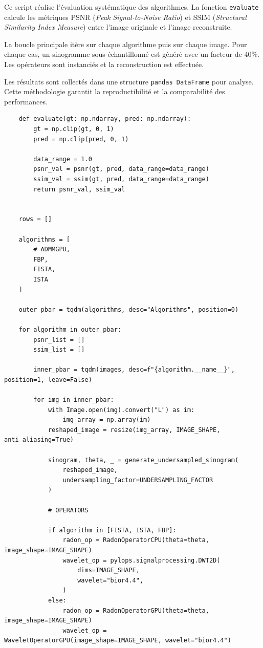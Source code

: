 
Ce script réalise l'évaluation systématique des algorithmes. La fonction \texttt{evaluate} calcule les métriques PSNR (\emph{Peak Signal-to-Noise Ratio}) et SSIM (\emph{Structural Similarity Index Measure}) entre l'image originale et l'image reconstruite.

La boucle principale itère sur chaque algorithme puis sur chaque image. Pour chaque cas, un sinogramme sous-échantillonné est généré avec un facteur de $40\%$. Les opérateurs sont instanciés et la reconstruction est effectuée.

Les résultats sont collectés dans une structure \texttt{pandas DataFrame} pour analyse. Cette méthodologie garantit la reproductibilité et la comparabilité des performances.
\begin{verbatim}
    def evaluate(gt: np.ndarray, pred: np.ndarray):
        gt = np.clip(gt, 0, 1)
        pred = np.clip(pred, 0, 1)

        data_range = 1.0
        psnr_val = psnr(gt, pred, data_range=data_range)
        ssim_val = ssim(gt, pred, data_range=data_range)
        return psnr_val, ssim_val


    rows = []

    algorithms = [
        # ADMMGPU,
        FBP,
        FISTA,
        ISTA
    ]

    outer_pbar = tqdm(algorithms, desc="Algorithms", position=0)

    for algorithm in outer_pbar:
        psnr_list = []
        ssim_list = []

        inner_pbar = tqdm(images, desc=f"{algorithm.__name__}", position=1, leave=False)

        for img in inner_pbar:
            with Image.open(img).convert("L") as im:
                img_array = np.array(im)
            reshaped_image = resize(img_array, IMAGE_SHAPE, anti_aliasing=True)

            sinogram, theta, _ = generate_undersampled_sinogram(
                reshaped_image,
                undersampling_factor=UNDERSAMPLING_FACTOR
            )

            # OPERATORS

            if algorithm in [FISTA, ISTA, FBP]:
                radon_op = RadonOperatorCPU(theta=theta, image_shape=IMAGE_SHAPE)
                wavelet_op = pylops.signalprocessing.DWT2D(
                    dims=IMAGE_SHAPE,
                    wavelet="bior4.4",
                )
            else:
                radon_op = RadonOperatorGPU(theta=theta, image_shape=IMAGE_SHAPE)
                wavelet_op = WaveletOperatorGPU(image_shape=IMAGE_SHAPE, wavelet="bior4.4")


\end{verbatim}
